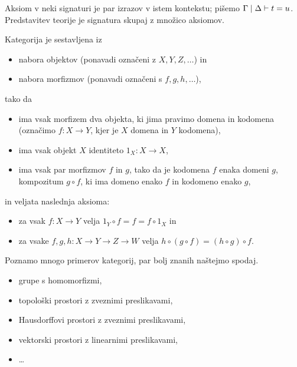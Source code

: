 \begin{definition}[Aksiomi]
    Aksiom v neki signaturi je par izrazov v istem kontekstu; pišemo \(\Gamma \mid \Delta \vdash t=u\).
    Predstavitev teorije je signatura skupaj z množico aksiomov.
\end{definition}

\begin{definition}
    Kategorija je sestavljena iz
    \begin{itemize}
        \item nabora objektov (ponavadi označeni z \(X,Y,Z,…\)) in
        \item nabora morfizmov (ponavadi označeni s \(f,g,h,…\)),
    \end{itemize}
    tako da
    \begin{itemize}
        \item ima vsak morfizem dva objekta, ki jima pravimo domena in kodomena (označimo \(f : X → Y\), kjer je \(X\) domena in \(Y\) kodomena),
        \item ima vsak objekt \(X\) identiteto \(1_X : X → X\),
        \item ima vsak par morfizmov \(f\) in \(g\), tako da je kodomena \(f\) enaka domeni \(g\), kompozitum \(g∘f\), ki ima domeno enako \(f\) in kodomeno enako \(g\),
    \end{itemize}
    in veljata naslednja aksioma:
    \begin{itemize}
        \item za vsak \(f : X → Y\) velja \(1_Y∘f = f = f∘1_X\) in
        \item za vsake \(f,g,h : X → Y → Z → W\) velja \(h∘(g∘f) = (h∘g)∘f\).
    \end{itemize}
\end{definition}

\begin{examples}
    Poznamo mnogo primerov kategorij, par bolj znanih naštejmo spodaj.
    \begin{itemize}
        \item grupe s homomorfizmi,
        \item topološki prostori z zveznimi preslikavami,
        \item Hausdorffovi prostori z zveznimi preslikavami,
        \item vektorski prostori z linearnimi preslikavami,
        \item …
    \end{itemize}
\end{examples}

